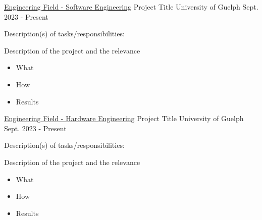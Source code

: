 
\begin{cventries}
  \cventry
    {\href{https://github.com/TevHeath}{Engineering Field - Software Engineering}} %
    {Project Title } %
    {University of Guelph} %
    {Sept. 2023 - Present} %
     {\renewcommand{\labelitemii}{\bullet}
      \begin{cvitems} Description(s) of tasks/responsibilities:
         \item {Description of the project and the relevance}
        \begin{itemize} 
            \item {What}
            \item{How}
            \item {Results}
        \end{itemize}
      \end{cvitems}
    }

  \cventry
    {\href{https://github.com/TevHeath}{Engineering Field - Hardware Engineering}} %
    {Project Title } %
    {University of Guelph} %
    {Sept. 2023 - Present} %
     {\renewcommand{\labelitemii}{\bullet}
      \begin{cvitems} Description(s) of tasks/responsibilities:
         \item {Description of the project and the relevance}
        \begin{itemize} 
            \item {What}
            \item{How}
            \item {Results}
        \end{itemize}
      \end{cvitems}
    }


\end{cventries}
